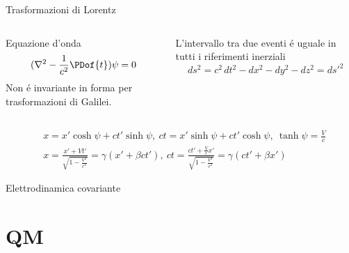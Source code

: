 \begin{frame}{Trasformazioni di Lorentz}
    \begin{columns}[T]
    \begin{column}{0.4\textwidth}
\begin{block}{Equazione d'onda}
\begin{equation*}
   (\nabla^2-\frac{1}{c^2}\PDof{t})\psi=0 
\end{equation*}
Non \'e invariante in forma per trasformazioni di Galilei.
\end{block}
    \end{column}
    \begin{column}{0.6\textwidth}
    \begin{block}{L'intervallo tra due eventi \'e uguale in tutti i riferimenti inerziali}
    \begin{equation*}
        ds^2=c^2\,dt^2-dx^2-dy^2-dz^2=ds'^2
    \end{equation*}
    \end{block}
    \end{column}
    \end{columns}
    \begin{align*}
        &x=x'\cosh{\psi}+ct'\sinh{\psi},\ ct=x'\sinh{\psi}+ct'\cosh{\psi},\ \tanh{\psi}=\frac{V}{c}\\
        &x=\frac{x'+Vt'}{\sqrt{1-\frac{V^2}{c^2}}}=\gamma(x'+\beta ct'),\ ct=\frac{ct'+\frac{V}{c}x'}{\sqrt{1-\frac{V^2}{c^2}}}=\gamma(ct'+\beta x')
    \end{align*}
\end{frame}

\begin{frame}{Elettrodinamica covariante}
    
\end{frame}



\section{QM}

